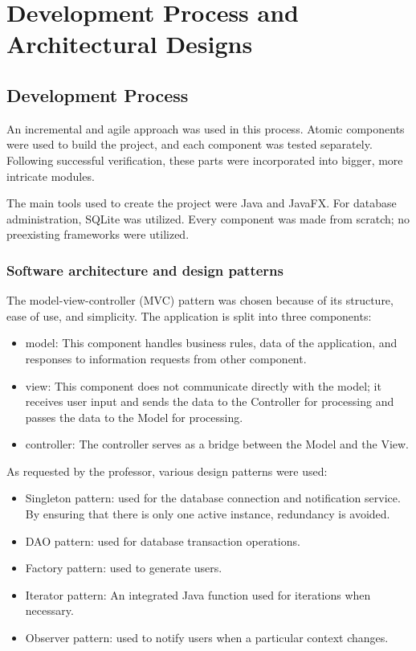 \documentclass[10pt, titlepage]{article}
\begin{document}
    \section{Development Process and Architectural Designs}
    \subsection{Development Process}
    An incremental and agile approach was used in this process. Atomic components were used to build the project, and each component was tested separately. Following successful verification, these parts were incorporated into bigger, more intricate modules. 
    
    The main tools used to create the project were Java and JavaFX. For database administration, SQLite was utilized. Every component was made from scratch; no preexisting frameworks were utilized.

    \subsubsection{Software architecture and design patterns}
    The model-view-controller (MVC) pattern was chosen because of its structure, ease of use, and simplicity. The application is split into three components: 
    \begin{itemize}
        \item model: This component handles business rules, data of the application, and responses to information requests from other component.
        \item view: This component does not communicate directly with the model; it receives user input and sends the data to the Controller for processing and passes the data to the Model for processing. 
        \item controller: The controller serves as a bridge between the Model and the View.
    \end{itemize}

    As requested by the professor, various design patterns were used:
    \begin{itemize}
        \item Singleton pattern: used for the database connection and notification service. By ensuring that there is only one active instance, redundancy is avoided.
        \item DAO pattern: used for database transaction operations.
        \item Factory pattern: used to generate users.
        \item Iterator pattern: An integrated Java function used for iterations when necessary.
        \item Observer pattern: used to notify users when a particular context changes.
    \end{itemize}
    
\end{document}
